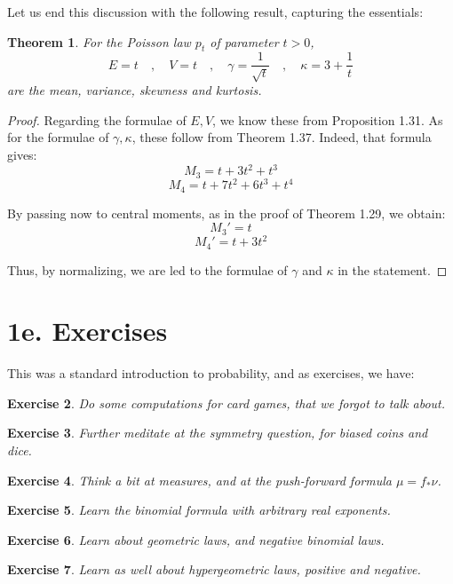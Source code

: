 \documentclass[12pt]{amsbook}
\newtheorem{theorem}{Theorem}[chapter]
\newtheorem{exercise}[theorem]{Exercise}
\begin{document}
Let us end this discussion with the following result, capturing the essentials:

\begin{theorem}
For the Poisson law $p_t$ of parameter $t>0$,
$$E=t\quad,\quad  V=t\quad ,\quad \gamma=\frac{1}{\sqrt{t}}\quad ,\quad \kappa=3+\frac{1}{t}$$
are the mean, variance, skewness and kurtosis.
\end{theorem}

\begin{proof}
Regarding the formulae of $E,V$, we know these from Proposition 1.31. As for the formulae of $\gamma,\kappa$, these follow from Theorem 1.37. Indeed, that formula gives:
$$M_3=t+3t^2+t^3$$
$$M_4=t+7t^2+6t^3+t^4$$

By passing now to central moments, as in the proof of Theorem 1.29, we obtain:
$$M_3'=t$$
$$M_4'=t+3t^2$$

Thus, by normalizing, we are led to the formulae of $\gamma$ and $\kappa$ in the statement.
\end{proof}

\section*{1e. Exercises}

This was a standard introduction to probability, and as exercises, we have:

\begin{exercise}
Do some computations for card games, that we forgot to talk about.
\end{exercise}

\begin{exercise}
Further meditate at the symmetry question, for biased coins and dice.
\end{exercise}

\begin{exercise}
Think a bit at measures, and at the push-forward formula $\mu=f_*\nu$.
\end{exercise}

\begin{exercise}
Learn the binomial formula with arbitrary real exponents.
\end{exercise}

\begin{exercise}
Learn about geometric laws, and negative binomial laws.
\end{exercise}

\begin{exercise}
Learn as well about hypergeometric laws, positive and negative.
\end{exercise}
\end{document}
